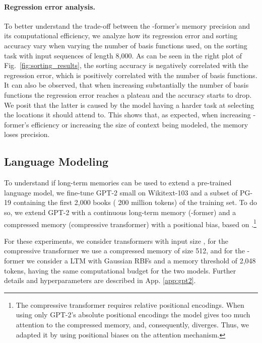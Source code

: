 \documentclass[11pt]{article}
\begin{document}
\paragraph{Regression error analysis. }
To better understand the trade-off between the \mbox{-former}'s memory precision and its computational efficiency, we analyze how its regression error and sorting accuracy vary when varying the number of basis functions used, on the sorting task with input sequences of length 8,000. 
As can be seen in the right plot of Fig.~\ref{fig:sorting_results}, the sorting accuracy is negatively correlated with the regression error, which is positively correlated with the number of basis functions.
It can also be observed, that when increasing substantially the number of basis functions the regression error reaches a plateau and the accuracy starts to drop. We posit that the latter is caused by the model having a harder task at selecting the locations it should attend to. 
This shows that, as expected, when increasing \mbox{-former}'s efficiency or increasing the size of context being modeled, the memory loses precision.

\subsection{Language Modeling}
\label{sec:gpt2}
To understand if long-term memories can be used to extend a pre-trained language model, we fine-tune GPT-2 small  \citep{radford2019language} on Wikitext-103 \citep{merity2016pointer} and a subset of PG-19 \citep{rae2019compressive} containing the first 2,000 books ( 200 million tokens) 
of the training set. To do so, we extend GPT-2 with a continuous long-term memory (\mbox{-former}) and a compressed memory (compressive transformer) with a positional bias, based on \citet{press2021train}.\footnote{The compressive transformer requires relative positional encodings. When using only GPT-2's absolute positional encodings the model gives too much attention to  the compressed memory, and, consequently, diverges. Thus, we adapted it by using positional biases on the attention mechanism.} 

For these experiments, we consider transformers with input size , 
for the compressive transformer we use a compressed memory of size 512, and for the \mbox{-former} we consider a LTM with  Gaussian RBFs and a memory threshold of 2,048 tokens, having the same computational budget for the two models. 
Further details and hyperparameters are described in App. \ref{app:gpt2}.
\end{document}
